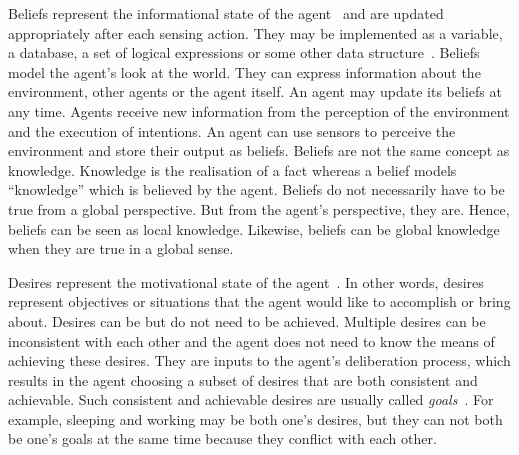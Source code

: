 Beliefs represent the informational state of the agent~\cite{Rao_BDITheory_1995} and are updated appropriately after each sensing action.
They may be implemented as a variable, a database, a set of logical expressions or some other data structure~\cite{Rao_BDITheory_1995}.
Beliefs model the agent's look at the world.
They can express information about the environment, other agents or the agent itself.
An agent may update its beliefs at any time.
Agents receive new information from the perception of the environment and the execution of intentions.
An agent can use sensors to perceive the environment and store their output as beliefs.
Beliefs are not the same concept as knowledge.
Knowledge is the realisation of a fact whereas a belief models \enquote{knowledge} which is believed by the agent.
Beliefs do not necessarily have to be true from a global perspective.
But from the agent's perspective, they are.
Hence, beliefs can be seen as local knowledge.
Likewise, beliefs can be global knowledge when they are true in a global sense.

Desires represent the motivational state of the agent~\cite{Rao_BDITheory_1995}.
In other words, desires represent objectives or situations that the agent would like to accomplish or bring about.
Desires can be but do not need to be achieved.
Multiple desires can be inconsistent with each other and the agent does not need to know the means of achieving these desires.
They are inputs to the agent's deliberation process, which results in the agent choosing a subset of desires that are both consistent and achievable.
Such consistent and achievable desires are usually called \emph{goals}~\cite{Gerhard_MultiSystem_1999}.
For example, sleeping and working may be both one's desires, but they can not both be one's goals at the same time because they conflict with each other.

